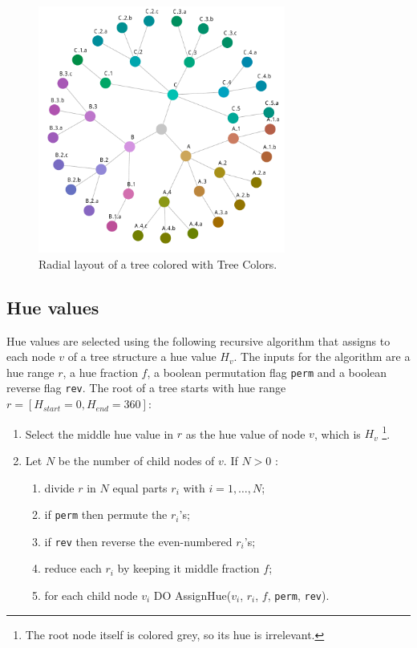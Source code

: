 \documentclass[review,journal]{vgtc}         %
\begin{document}
\begin{figure}[tb]

  \centering
  \includegraphics[width=3.2in]{HCPgraph.pdf}
  \caption{Radial layout of a tree colored with Tree Colors.}\label{fig:graph}

\end{figure}

\subsection{Hue values}
Hue values are selected using the following recursive algorithm that assigns to each node 
$v$ of a tree structure a hue value $H_{v}$. 
The inputs for the algorithm are a hue range $r$, a hue fraction $f$, a boolean permutation flag  
\texttt{perm} and a boolean reverse flag \texttt{rev}.
The root of a tree starts with hue range $r=[H_{start}=0, H_{end}=360]$:

%
\begin{enumerate} \itemsep1pt \parskip0pt 
\item Select the middle hue value in $r$ as the hue value of node $v$, which is $H_v$ \footnote{The root node itself is colored grey, so its hue is irrelevant.}.
\item Let $N$ be the number of child nodes of $v$. If $N>0$ :
\begin{enumerate}[i] \itemsep1pt \parskip0pt 
\item divide $r$ in $N$ equal parts $r_i$ with $i=1,\ldots,N$;
\item if \texttt{perm} then permute the $r_i$'s;
\item if \texttt{rev} then reverse the even-numbered $r_i$'s;
\item reduce each $r_i$ by keeping it middle fraction $f$;
\item for each child node $v_i$ DO AssignHue($v_i$, $r_i$, $f$, \texttt{perm}, \texttt{rev}).
\end{enumerate}
\end{enumerate}
\end{document}
